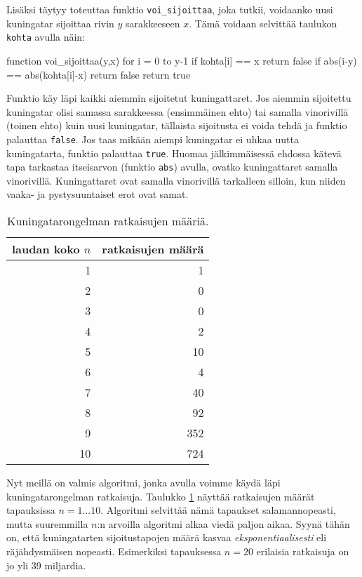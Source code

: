 Lisäksi täytyy toteuttaa funktio \texttt{voi\_sijoittaa},
joka tutkii, voidaanko uusi kuningatar sijoittaa
rivin $y$ sarakkeeseen $x$.
Tämä voidaan selvittää taulukon \texttt{kohta} avulla näin:

\begin{code}
function voi_sijoittaa(y,x)
    for i = 0 to y-1
        if kohta[i] == x
            return false
        if abs(i-y) == abs(kohta[i]-x)
            return false
    return true
\end{code}

Funktio käy läpi kaikki aiemmin sijoitetut kuningattaret.
Jos aiemmin sijoitettu kuningatar olisi samassa sarakkeessa
(ensimmäinen ehto) tai samalla vinorivillä (toinen ehto)
kuin uusi kuningatar, tällaista sijoitusta ei voida tehdä
ja funktio palauttaa \texttt{false}.
Jos taas mikään aiempi kuningatar ei uhkaa uutta kuningatarta,
funktio palauttaa \texttt{true}.
Huomaa jälkimmäisessä ehdossa kätevä tapa tarkastaa
itseisarvon (funktio \texttt{abs}) avulla,
ovatko kuningattaret samalla vinorivillä.
Kuningattaret ovat samalla vinorivillä tarkalleen silloin,
kun niiden vaaka- ja pystysuuntaiset erot ovat samat.

\begin{table}
\center
\begin{tabular}{rr}
laudan koko $n$ & ratkaisujen määrä \\
\hline
1 & 1 \\
2 & 0 \\
3 & 0 \\
4 & 2 \\
5 & 10 \\
6 & 4 \\
7 & 40 \\
8 & 92 \\
9 & 352 \\
10 & 724 \\
\end{tabular}
\caption{Kuningatarongelman ratkaisujen määriä.}
\label{tab:kuning}
\end{table}

Nyt meillä on valmis algoritmi, jonka avulla voimme
käydä läpi kuningatarongelman ratkaisuja.
Taulukko \ref{tab:kuning} näyttää ratkaisujen määrät
tapauksissa $n=1 \dots 10$.
Algoritmi selvittää nämä tapaukset salamannopeasti,
mutta suuremmilla $n$:n arvoilla algoritmi alkaa viedä paljon aikaa.
Syynä tähän on, että kuningatarten sijoitustapojen
määrä kasvaa \emph{eksponentiaalisesti}
eli räjähdysmäisen nopeasti.
Esimerkiksi tapauksessa $n=20$ erilaisia ratkaisuja on jo yli 39 miljardia.

